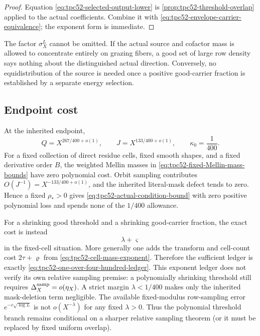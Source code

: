 \begin{proof}
Equation \eqref{eq:tpc52-selected-output-lower} is
\cref{prop:tpc52-threshold-overlap} applied to the actual coefficients.
Combine it with \eqref{eq:tpc52-envelope-carrier-equivalence}; the exponent
form is immediate.
\end{proof}

The factor \(\sigma_X^L\) cannot be omitted.  If the actual source and
cofactor mass is allowed to concentrate entirely on grazing fibers, a good
set of large row density says nothing about the distinguished actual
direction.  Conversely, no equidistribution of the source is needed once a
positive good-carrier fraction is established by a separate energy
selection.

\subsection{Endpoint cost}

At the inherited endpoint,
\begin{equation}
 Q=X^{267/400+o(1)},
 \qquad J=X^{133/400+o(1)},
 \qquad \kappa_0=\frac1{400}.
 \label{eq:tpc52-endpoint-scales}
\end{equation}
For a fixed collection of direct residue cells, fixed smooth shapes, and a
fixed derivative order \(B\), the weighted Mellin masses in
\eqref{eq:tpc52-fixed-Mellin-mass-bounds} have zero polynomial cost.  Orbit
sampling contributes \(O(J^{-1})=X^{-133/400+o(1)}\), and the inherited
literal-mask defect tends to zero.  Hence a fixed
\(\rho_*>0\) gives \eqref{eq:tpc52-actual-condition-bound} with zero positive
polynomial loss and spends none of the \(1/400\) allowance.

For a shrinking good threshold and a shrinking good-carrier fraction, the
exact cost is instead
\begin{equation}
 \lambda+\varsigma
 \label{eq:tpc52-actual-endpoint-cost}
\end{equation}
in the fixed-cell situation.  More generally one adds the transform and
cell-count cost \(2\tau+\varrho\) from
\eqref{eq:tpc52-cell-mass-exponent}.  Therefore the sufficient ledger is
exactly \eqref{eq:tpc52-one-over-four-hundred-ledger}.  This exponent ledger
does not verify its own relative sampling premise: a polynomially shrinking
threshold still requires \(\Delta_X^{\rm samp}=o(\eta_X)\).  A strict margin
\(\lambda<1/400\) makes only the inherited mask-deletion term negligible.
The available fixed-modulus row-sampling error
\(e^{-c\sqrt{\log L}}\) is not \(o(X^{-\lambda})\) for any fixed
\(\lambda>0\).  Thus the polynomial threshold branch remains conditional on
a sharper relative sampling theorem (or it must be replaced by fixed uniform
overlap).

